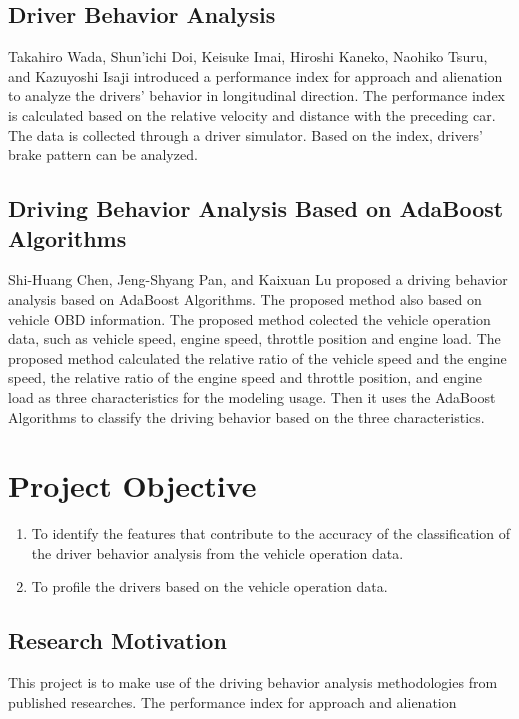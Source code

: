 \subsection{Driver Behavior Analysis}
Takahiro Wada, Shun'ichi Doi, Keisuke Imai, Hiroshi Kaneko, Naohiko Tsuru, and Kazuyoshi Isaji introduced a performance index for approach and alienation to analyze the drivers' behavior in longitudinal direction. The performance index is calculated based on the relative velocity and distance with the preceding car. The data is collected through a driver simulator. Based on the index, drivers' brake pattern can be analyzed.

\subsection{Driving Behavior Analysis Based on AdaBoost Algorithms}
Shi-Huang Chen, Jeng-Shyang Pan, and Kaixuan Lu proposed a driving behavior analysis based on AdaBoost Algorithms. The proposed method also based on vehicle OBD information. The proposed method colected the vehicle operation data, such as vehicle speed, engine speed, throttle position and engine load. The proposed method calculated the relative ratio of the vehicle speed and the engine speed, the relative ratio of the engine speed and throttle position, and engine load as three characteristics for the modeling usage. Then it uses the AdaBoost Algorithms to classify the driving behavior based on the three characteristics.

\section{Project Objective}
\begin{enumerate}
\item To identify the features that contribute to the accuracy of the classification of the driver behavior analysis from the vehicle operation data.
\item To profile the drivers based on the vehicle operation data. 
\end{enumerate}

\subsection{Research Motivation}
This project is to make use of the driving behavior analysis methodologies from published researches. The performance index for approach and alienation 